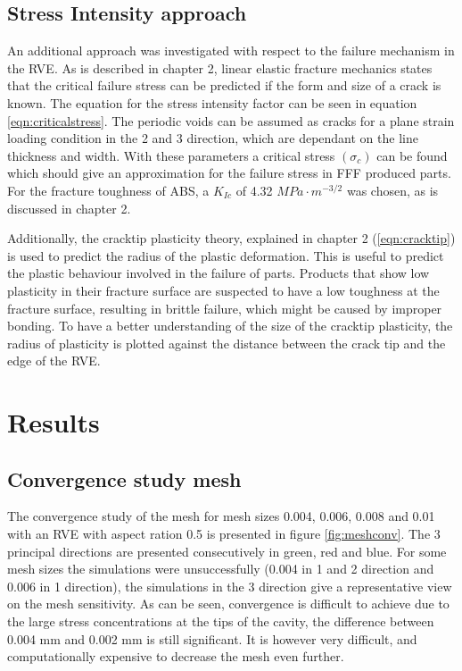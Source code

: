 \subsection{Stress Intensity approach}
An additional approach was investigated with respect to the failure mechanism in the RVE. As is described in chapter 2, linear elastic fracture mechanics states that the critical failure stress can be predicted if the form and size of a crack is known. The equation for the stress intensity factor can be seen in equation \ref{eqn:criticalstress}. The periodic voids can be assumed as cracks for a plane strain loading condition in the 2 and 3 direction, which are dependant on the line thickness and width. With these parameters a critical stress $(\sigma_c)$ can be found which should give an approximation for the failure stress in FFF produced parts.  For the fracture toughness of ABS, a $K_{Ic}$ of  4.32 $MPa \cdot m^{-3/2}$ was chosen, as is discussed in chapter 2.

Additionally, the cracktip plasticity theory, explained in chapter 2 (\ref{eqn:cracktip}) is used to predict the radius of the plastic deformation. This is useful to predict the plastic behaviour involved in the failure of parts. Products that show low plasticity in their fracture surface are suspected to have a low toughness at the fracture surface, resulting in brittle failure, which might be caused by improper  bonding. To have a better understanding of the size of the cracktip plasticity, the radius of plasticity is plotted against the distance between the crack tip and the edge of the RVE. 

\section{Results}
\subsection{Convergence study mesh}
The convergence study of the mesh for mesh sizes 0.004, 0.006, 0.008 and 0.01 with an RVE with aspect ration 0.5 is presented in figure \ref{fig:meshconv}. The 3 principal directions are presented consecutively in green, red and blue. For some mesh sizes the simulations were unsuccessfully (0.004 in 1 and 2 direction and 0.006 in 1 direction), the simulations in the 3 direction give a representative view on the mesh sensitivity.  As can be seen,  convergence is difficult to achieve due to the large stress concentrations at the tips of the cavity, the difference between 0.004 mm and 0.002 mm is still significant. It is however very difficult, and computationally expensive to decrease the mesh even further.  

